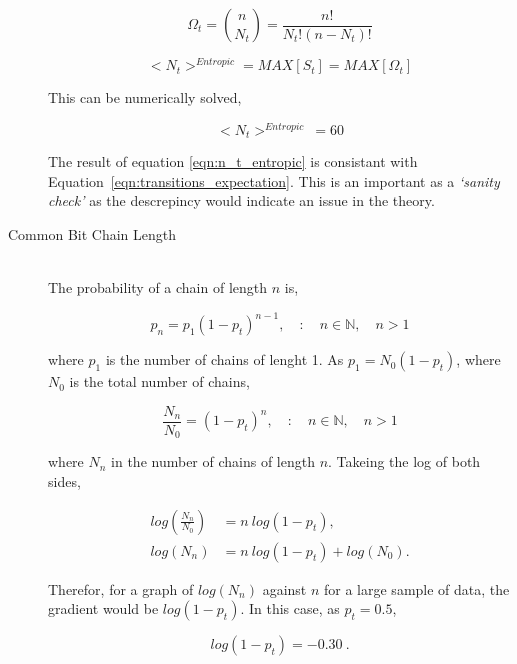 \begin{description}
					\begin{equation}
						\Omega_t = \binom{n}{N_t} = \frac{n!}{N_{t}!(n-N_{t})!}
					\end{equation}

					\begin{equation}
						<N_t>^{Entropic} = MAX[S_t] = MAX[\Omega_t]
					\end{equation}

					This can be numerically solved,

					\begin{equation}
						<N_t>^{Entropic}\ = 60
						\label{eqn:n_t_entropic}
					\end{equation}

					The result of equation \ref{eqn:n_t_entropic} is consistant with Equation~\ref{eqn:transitions_expectation}. This is an important as a \textit{`sanity check'} as the descrepincy would indicate an issue in the theory.

				\item[Common Bit Chain Length] \hfill \\
					
					The probability of a chain of length $n$ is,

					\begin{equation}
						p_n = p_1(1 - p_t)^{n-1}, \quad : \quad n \in \mathbb{N}, \quad n > 1
					\end{equation}

					where $p_1$ is the number of chains of lenght 1. 
					As $p_1 = N_0 (1 -p_t)$, where $N_0$ is the total number of chains,

					\begin{equation}
						\frac{N_n}{N_0} = (1 - p_t)^n, \quad : \quad n \in \mathbb{N}, \quad n > 1
					\end{equation}

					where $N_n$ in the number of chains of length $n$.
					Takeing the log of both sides,

					\begin{align}
						log\left(\frac{N_n}{N_0}\right) &= n\ log(1 - p_t), \nonumber \\
						log(N_n) &= n\  log(1 - p_t) + log(N_0).
					\end{align}

					Therefor, for a graph of $log(N_n)$ against $n$ for a large sample of data, the gradient would be $log(1 - p_t)$.
					In this case, as $p_t = 0.5$, 

					\begin{equation}
						log(1 - p_t) = -0.30\ .
						\label{eqn:log_chain_length_gradient}			
					\end{equation}


\end{description}
